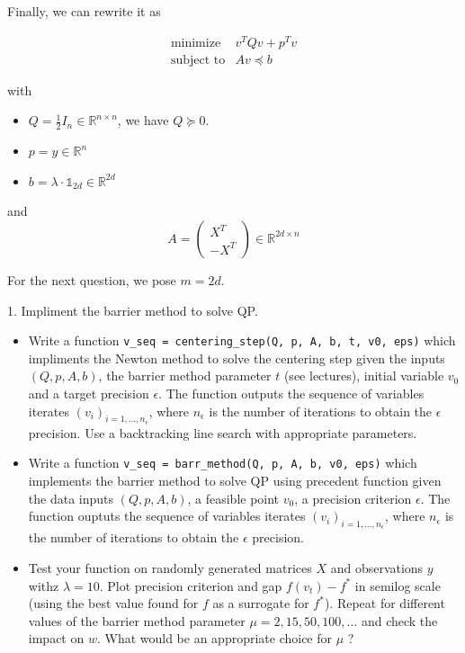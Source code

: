 \documentclass[11pt]{article}
\providecommand{\tightlist}{%
      \setlength{\itemsep}{0pt}\setlength{\parskip}{0pt}}
\begin{document}
Finally, we can rewrite it as

\begin{equation}
\tag{QP}
\begin{array}{ll}
\text{minimize} & v^TQv + p^Tv \\
\text{subject to} & Av \preceq b
\end{array}
\end{equation}

with

\begin{itemize}
\tightlist
\item
  \(Q = \frac{1}{2} I_n \in \mathbb{R}^{n \times n}\), we have
  \(Q \succeq 0\).
\item
  \(p = y \in \mathbb{R}^{n}\)
\item
  \(b = \lambda \cdot \mathbb{1}_{2d} \in \mathbb{R}^{2d}\)
\end{itemize}

and \begin{equation*}
A = \left(
    \begin{array}{c}
    X^T \\
    -X^T
    \end{array}
\right)
\in \mathbb{R}^{2d \times n}
\end{equation*}

For the next question, we pose \(m=2d\).

    1. Impliment the barrier method to solve QP.

\begin{itemize}
\tightlist
\item
  Write a function
  \texttt{v\_seq\ =\ centering\_step(Q,\ p,\ A,\ b,\ t,\ v0,\ eps)}
  which impliments the Newton method to solve the centering step given
  the inputs \((Q, p, A, b)\), the barrier method parameter \(t\) (see
  lectures), initial variable \(v_0\) and a target precision
  \(\epsilon\). The function outputs the sequence of variables iterates
  \((v_i)_{i=1, \ldots, n_{\epsilon}}\), where \(n_{\epsilon}\) is the
  number of iterations to obtain the \(\epsilon\) precision. Use a
  backtracking line search with appropriate parameters.
\item
  Write a function
  \texttt{v\_seq\ =\ barr\_method(Q,\ p,\ A,\ b,\ v0,\ eps)} which
  implements the barrier method to solve QP using precedent function
  given the data inputs \((Q, p, A, b)\), a feasible point \(v_0\), a
  precision criterion \(\epsilon\). The function ouptuts the sequence of
  variables iterates \((v_i)_{i=1, \ldots, n_{\epsilon}}\), where
  \(n_{\epsilon}\) is the number of iterations to obtain the
  \(\epsilon\) precision.
\item
  Test your function on randomly generated matrices \(X\) and
  observations \(y\) withz \(\lambda = 10\). Plot precision criterion
  and gap \(f(v_t) - f^*\) in semilog scale (using the best value found
  for \(f\) as a surrogate for \(f^*\)). Repeat for different values of
  the barrier method parameter \(\mu = 2, 15, 50, 100, \ldots\) and
  check the impact on \(w\). What would be an appropriate choice for
  \(\mu\) ?
\end{itemize}
\end{document}
